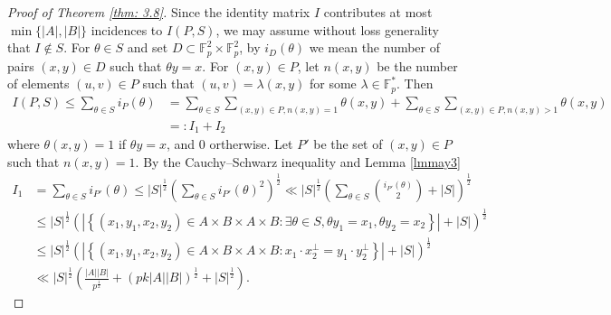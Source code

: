 \documentclass[11pt]{article}
\def\Fbb{\mathbb{F}}
\def\l({\left(}
\def\r){\right)}
\def\lv{\left\vert}
\def\rv{\right\vert}
\def\lo{\left\{}
\def\ro{\right\}}
\begin{document}
\begin{proof}[Proof of Theorem \ref{thm: 3.8}]
     Since the identity matrix $I$ contributes at most $\min\{|A|, |B|\}$ incidences to $I(P,S)$, we may assume without loss generality that $I \not\in S$.
    For $\theta\in S$ and set $D \subset \Fbb_p^2 \times \Fbb_p^2$, by $i_D(\theta)$ we mean the number of pairs $(x, y)\in D$ such that $\theta y=x$. For $(x,y)\in P$, let $n(x,y)$ be the number of elements $(u,v) \in P$ such that $(u,v)=\lambda (x,y)$ for some $\lambda \in \Fbb_p^\ast$. Then  
\begin{align*}
    I(P, S)\le \sum_{\theta\in S}i_P(\theta) & = \sum_{\theta \in S}\sum_{(x,y) \in P , n(x,y)=1} \theta (x,y)+ \sum_{\theta \in S}\sum_{(x,y) \in P , n(x,y)>1} \theta (x,y)\\ 
    & =: I_1 +I_2
\end{align*} 
where $\theta (x,y)=1$ if $\theta y=x$, and $0$ ortherwise. Let $P'$ be the set of $(x, y)\in P$ such that $n(x, y)=1$. By the Cauchy--Schwarz inequality and Lemma \ref{lmmay3}
\begin{align*}
    I_1&=\sum_{\theta \in S } i_{P'}
    (\theta) \le |S|^{\frac{1}{2}}\left(\sum_{\theta \in S}i_{P'}(\theta)^2\right)^{\frac{1}{2}} \ll \lv S\rv^{\frac{1}{2}} \l( \sum_{\theta \in S} \binom{i_{P'}(\theta)}{2} +\lv S\rv \r)^{\frac{1}{2}} \\
    & \le \lv S\rv^{\frac{1}{2}} \l( \lv \lo \l( x_1,y_1,x_2,y_2 \r) \in A\times B\times A \times B \colon \exists \theta \in S , \theta y_1 =x_1 ,\theta y_2 =x_2 \ro \rv +\lv S\rv \r)^{\frac{1}{2}}\\
    & \le \lv S\rv^{\frac{1}{2}} \l( \lv \lo \l( x_1,y_1,x_2,y_2 \r) \in A\times B\times A \times B \colon x_1\cdot x_2^\perp =y_1\cdot y_2^\perp \ro \rv +\lv S\rv \r)^{\frac{1}{2}}\\
    & \ll \lv S\rv^{\frac{1}{2}} \l(  \frac{|A||B|}{p^{\frac{1}{2}}} + (pk|A||B|)^{\frac{1}{2}} + \lv S\rv^{\frac{1}{2}} \r) .

\end{align*}
\end{proof}
\end{document}
